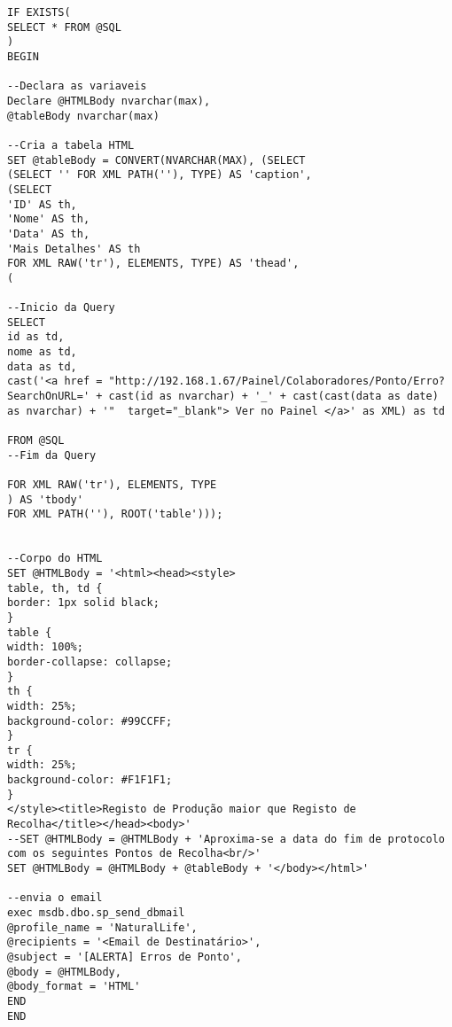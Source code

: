 \begin{verbatim}
IF EXISTS(
SELECT * FROM @SQL
)
BEGIN

--Declara as variaveis
Declare @HTMLBody nvarchar(max),
@tableBody nvarchar(max)

--Cria a tabela HTML
SET @tableBody = CONVERT(NVARCHAR(MAX), (SELECT
(SELECT '' FOR XML PATH(''), TYPE) AS 'caption',
(SELECT 
'ID' AS th,
'Nome' AS th,
'Data' AS th,
'Mais Detalhes' AS th 
FOR XML RAW('tr'), ELEMENTS, TYPE) AS 'thead',
(

--Inicio da Query
SELECT 
id as td,
nome as td,
data as td,
cast('<a href = "http://192.168.1.67/Painel/Colaboradores/Ponto/Erro?SearchOnURL=' + cast(id as nvarchar) + '_' + cast(cast(data as date) as nvarchar) + '"  target="_blank"> Ver no Painel </a>' as XML) as td

FROM @SQL
--Fim da Query

FOR XML RAW('tr'), ELEMENTS, TYPE
) AS 'tbody'
FOR XML PATH(''), ROOT('table')));


--Corpo do HTML
SET @HTMLBody = '<html><head><style>
table, th, td {
border: 1px solid black;
}
table {
width: 100%;
border-collapse: collapse;
}
th {
width: 25%;
background-color: #99CCFF;
}
tr {
width: 25%;
background-color: #F1F1F1;
}
</style><title>Registo de Produção maior que Registo de Recolha</title></head><body>'
--SET @HTMLBody = @HTMLBody + 'Aproxima-se a data do fim de protocolo com os seguintes Pontos de Recolha<br/>'
SET @HTMLBody = @HTMLBody + @tableBody + '</body></html>'

--envia o email
exec msdb.dbo.sp_send_dbmail 
@profile_name = 'NaturalLife', 
@recipients = '<Email de Destinatário>',
@subject = '[ALERTA] Erros de Ponto', 
@body = @HTMLBody, 
@body_format = 'HTML'
END
END
\end{verbatim}